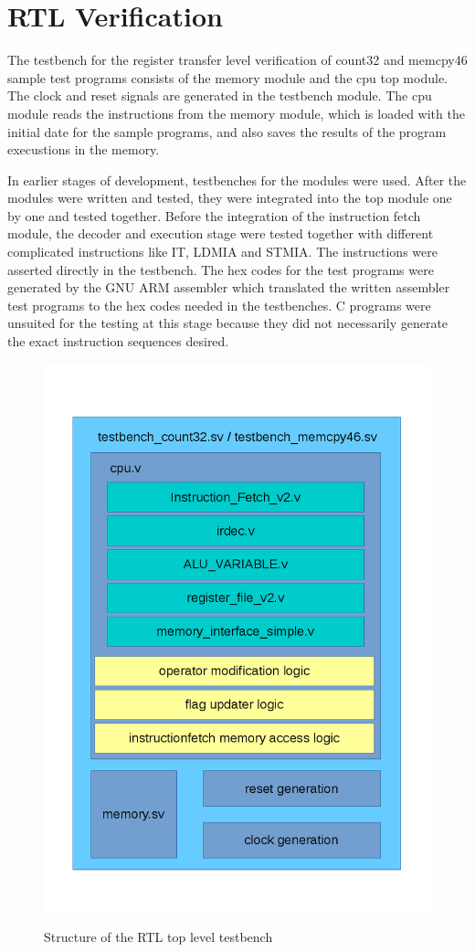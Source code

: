 \section{RTL Verification}
\label{sec:rtlverification}
The testbench for the register transfer level verification of count32 and memcpy46 sample test programs consists of the memory module and the cpu top module. The clock and reset signals are generated in the testbench module. The cpu module reads the instructions from the memory module, which is loaded with the initial date for the sample programs, and also saves the results of the program execustions in the memory.

In earlier stages of development, testbenches for the modules were used. After the modules were written and tested, they were integrated into the top module one by one and tested together. Before the integration of the instruction fetch module, the decoder and execution stage were tested together with different complicated instructions like IT, LDMIA and STMIA. The instructions were asserted directly in the testbench. The hex codes for the test programs were generated by the GNU ARM assembler which translated the written assembler test programs to the hex codes needed in the testbenches. C programs were unsuited for the testing at this stage because they did not necessarily generate the exact instruction sequences desired.

\begin{figure}
\centering
\includegraphics[scale=0.5]{images/rtltestbenchdrawing.png}
\label{fig:rtltestbenchdrawing}
\caption{Structure of the RTL top level testbench}
\end{figure}
